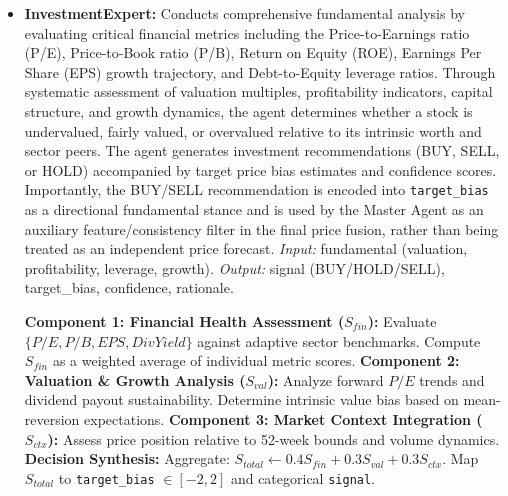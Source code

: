 \documentclass{ieeeaccess}
\begin{document}
\begin{itemize}
    \item \textbf{InvestmentExpert:} 
    Conducts comprehensive fundamental analysis by evaluating critical financial metrics including the Price-to-Earnings ratio (P/E), Price-to-Book ratio (P/B), Return on Equity (ROE), Earnings Per Share (EPS) growth trajectory, and Debt-to-Equity leverage ratios. Through systematic assessment of valuation multiples, profitability indicators, capital structure, and growth dynamics, the agent determines whether a stock is undervalued, fairly valued, or overvalued relative to its intrinsic worth and sector peers. The agent generates investment recommendations (BUY, SELL, or HOLD) accompanied by target price bias estimates and confidence scores. Importantly, the BUY/SELL recommendation is encoded into \texttt{target\_bias} as a directional fundamental stance and is used by the Master Agent as an auxiliary feature/consistency filter in the final price fusion, rather than being treated as an independent price forecast.  
    \textit{Input:} fundamental (valuation, profitability, leverage, growth).  
    \textit{Output:} signal (BUY/HOLD/SELL), target\_bias, confidence, rationale.

    \begin{breakablealgorithm}
    \caption{InvestmentExpert fundamental scoring}
    \begin{algorithmic}[1]
    \STATE \textbf{Component 1: Financial Health Assessment ($S_{fin}$):}
    \STATE \quad Evaluate $\{P/E, P/B, EPS, DivYield\}$ against adaptive sector benchmarks.
    \STATE \quad Compute $S_{fin}$ as a weighted average of individual metric scores.
    \STATE \textbf{Component 2: Valuation \& Growth Analysis ($S_{val}$):}
    \STATE \quad Analyze forward $P/E$ trends and dividend payout sustainability.
    \STATE \quad Determine intrinsic value bias based on mean-reversion expectations.
    \STATE \textbf{Component 3: Market Context Integration ($S_{ctx}$):}
    \STATE \quad Assess price position relative to 52-week bounds and volume dynamics.
    \STATE \textbf{Decision Synthesis:}
    \STATE \quad Aggregate: $S_{total} \gets 0.4 S_{fin} + 0.3 S_{val} + 0.3 S_{ctx}$.
    \STATE \quad Map $S_{total}$ to \texttt{target\_bias} $\in [-2, 2]$ and categorical \texttt{signal}.
    \end{algorithmic}
    \end{breakablealgorithm}


\end{itemize}
\end{document}
